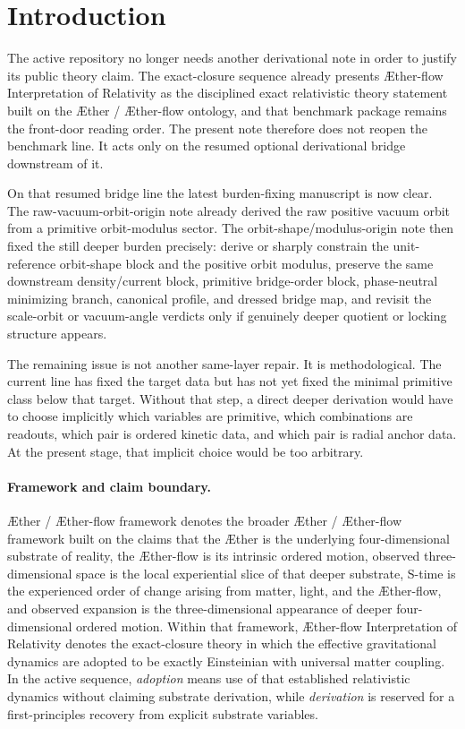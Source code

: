 \documentclass[11pt]{article}
\newcommand{\Aether}{\AE{}ther}
\newcommand{\Aflow}{\AE{}ther-flow}
\newcommand{\TheoryName}{\Aflow{} Interpretation of Relativity}
\newcommand{\TheoryProgram}{\Aether{} / \Aflow{} framework}
\begin{document}
\section{Introduction}

The active repository no longer needs another derivational note in order to justify its public theory claim. The exact-closure sequence already presents \TheoryName{} as the disciplined exact relativistic theory statement built on the \Aether{} / \Aflow{} ontology, and that benchmark package remains the front-door reading order. The present note therefore does not reopen the benchmark line. It acts only on the resumed optional derivational bridge downstream of it.

On that resumed bridge line the latest burden-fixing manuscript is now clear. The raw-vacuum-orbit-origin note already derived the raw positive vacuum orbit from a primitive orbit-modulus sector. The orbit-shape/modulus-origin note then fixed the still deeper burden precisely: derive or sharply constrain the unit-reference orbit-shape block and the positive orbit modulus, preserve the same downstream density/current block, primitive bridge-order block, phase-neutral minimizing branch, canonical profile, and dressed bridge map, and revisit the scale-orbit or vacuum-angle verdicts only if genuinely deeper quotient or locking structure appears.

The remaining issue is not another same-layer repair. It is methodological. The current line has fixed the target data but has not yet fixed the minimal primitive class below that target. Without that step, a direct deeper derivation would have to choose implicitly which variables are primitive, which combinations are readouts, which pair is ordered kinetic data, and which pair is radial anchor data. At the present stage, that implicit choice would be too arbitrary.

\paragraph{Framework and claim boundary.}
\TheoryProgram{} denotes the broader \Aether{} / \Aflow{} framework built on the claims that the \Aether{} is the underlying four-dimensional substrate of reality, the \Aflow{} is its intrinsic ordered motion, observed three-dimensional space is the local experiential slice of that deeper substrate, S-time is the experienced order of change arising from matter, light, and the \Aflow{}, and observed expansion is the three-dimensional appearance of deeper four-dimensional ordered motion. Within that framework, \TheoryName{} denotes the exact-closure theory in which the effective gravitational dynamics are adopted to be exactly Einsteinian with universal matter coupling. In the active sequence, \emph{adoption} means use of that established relativistic dynamics without claiming substrate derivation, while \emph{derivation} is reserved for a first-principles recovery from explicit substrate variables.
\end{document}
